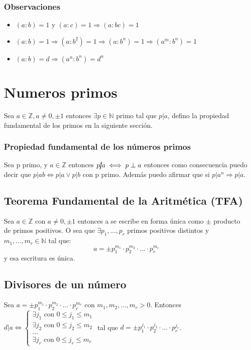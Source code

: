 \documentclass{report}
\begin{document}
\subsubsection{Observaciones}
\begin{itemize}
    \item $(a:b) = 1$ y $(a:c) = 1 \Rightarrow (a:bc) = 1$
    \item $(a:b) = 1 \Rightarrow (a:b^2) = 1 \Rightarrow (a:b^n) = 1 \Rightarrow (a^m: b^n) = 1$
    \item $(a:b) = d \Rightarrow (a^n: b^n) = d^n$
\end{itemize}

\section{Numeros primos}
Sea $a \in \mathbb{Z}, a\neq 0,\pm 1$ entonces $\exists p \in \mathbb{N}$ primo tal que $p|a$, defino la propiedad fundamental de los primos en la siguiente sección.
\subsubsection{Propiedad fundamental de los números primos}
Sea p primo, y $a \in \mathbb{Z}$ entonces $p \cancel{|}a \iff p \perp a$ entonces como consecuencia puedo decir que $p | ab \iff p|a \lor p|b$ con p primo. Además puedo afirmar que si $p|a^n \Rightarrow p|a$.

\subsection{Teorema Fundamental de la Aritmética (TFA)}
Sea $a \in \mathbb{Z}$ con $a \neq 0, \pm 1$ entonces a se escribe en forma única como $\pm$ producto de primos positivos. O sea que $\exists p_1,...,p_r$ primos positivos distintos y $m_1,...,m_r \in \mathbb{N}$ tal que: \begin{equation}
    a  = \pm p_1^{m_1} \cdot p_2^{m_2} \cdot ... \cdot p_r^{m_r}
\end{equation}
y esa escritura es única.

\subsection{Divisores de un número}
Sea $a = \pm p_1^{m_1} \cdot p_2^{m_2} \cdot ... \cdot p_r^{m_r}$ con $m_1,m_2,...,m_r > 0$. Entonces \begin{math}
    d|a \iff \begin{cases}
\exists j_1 \text{ con } 0 \leq j_1 \leq m_1 \\
\exists j_2 \text{ con } 0 \leq j_2 \leq m_2 \\
... \\
\exists j_r \text{ con } 0 \leq j_r \leq m_r
\end{cases}
\end{math}
tal que $d = \pm p_1^{j_1} \cdot p_2^{j_2} \cdot ... \cdot p_r^{j_r}$.
\end{document}
